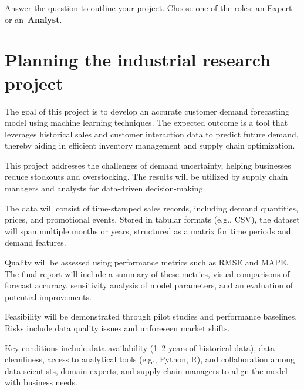 \documentclass[12pt]{article}
\date{}
\begin{document}
\maketitle

Answer the question to outline your project. Choose one of the roles: an {Expert} or an~\textbf{Analyst}.


\section{Planning the industrial research project}

The goal of this project is to develop an accurate customer demand forecasting model using machine learning techniques. The expected outcome is a tool that leverages historical sales and customer interaction data to predict future demand, thereby aiding in efficient inventory management and supply chain optimization.

This project addresses the challenges of demand uncertainty, helping businesses reduce stockouts and overstocking. The results will be utilized by supply chain managers and analysts for data-driven decision-making.

The data will consist of time-stamped sales records, including demand quantities, prices, and promotional events. Stored in tabular formats (e.g., CSV), the dataset will span multiple months or years, structured  as a matrix  for time periods and demand features.

Quality will be assessed using performance metrics such as RMSE and MAPE. The final report will include a summary of these metrics, visual comparisons of forecast accuracy, sensitivity analysis of model parameters, and an evaluation of potential improvements.

Feasibility will be demonstrated through pilot studies and performance baselines. Risks include data quality issues  and unforeseen market shifts. 

Key conditions include data availability (1–2 years of historical data), data cleanliness, access to analytical tools (e.g., Python, R), and collaboration among data scientists, domain experts, and supply chain managers to align the model with business needs.
\end{document}
